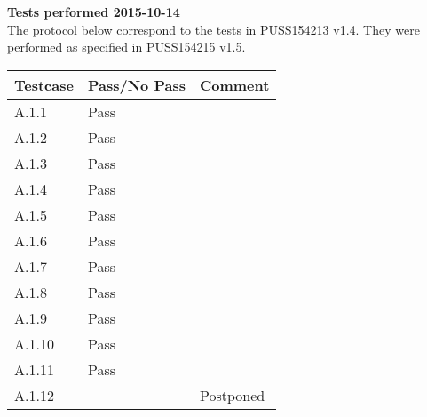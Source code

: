 \renewcommand{\testdate}{2015-10-14}
\textbf{ Tests performed \testdate} \\
The protocol below correspond to the tests in PUSS154213 v1.4. They were performed as specified in PUSS154215 v1.5.
\begin{center}
  		\begin{tabular}{| p{3cm} | p{5cm} | p{5cm} |}
    		\hline
	    	\textbf{Testcase}			& \textbf{Pass/No Pass} 	& \textbf{Comment} \\ \hline
    		A.1.1		 						& Pass 									&  \\ \hline
    		A.1.2		 						& Pass 										& 				 \\	\hline
    		A.1.3		 						& Pass 										& 				 \\	\hline
    		A.1.4		 						& Pass 										& 				 \\	\hline
    		A.1.5		 						& Pass 										& 				 \\	\hline
    		A.1.6		 						& Pass 										& 				 \\	\hline
    		A.1.7		 						& Pass 										& 				 \\	\hline
    		A.1.8		 						& Pass 										& 				 \\	\hline
    		A.1.9		 						& Pass 										& 				 \\	\hline
    		A.1.10	 							& Pass									& 				 \\	\hline
    		A.1.11	 							& Pass 										& 				 \\	\hline
    		A.1.12	 							&  										& Postponed				 \\	\hline
 		 \end{tabular}
\end{center}
	